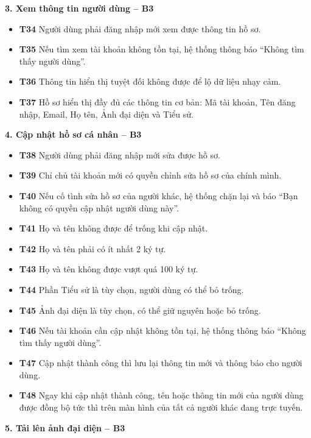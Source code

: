\documentclass[11pt,a4paper]{article}
\begin{document}
\smallskip
\noindent\textbf{3. Xem thông tin người dùng -- B3}
\begin{itemize}[leftmargin=0.9cm, label=$\bullet$, itemsep=2pt, topsep=4pt]
    \item \textbf{T34} Người dùng phải đăng nhập mới xem được thông tin hồ sơ.
    \item \textbf{T35} Nếu tìm xem tài khoản không tồn tại, hệ thống thông báo ``Không tìm thấy người dùng''.
    \item \textbf{T36} Thông tin hiển thị tuyệt đối không được để lộ dữ liệu nhạy cảm.
    \item \textbf{T37} Hồ sơ hiển thị đầy đủ các thông tin cơ bản: Mã tài khoản, Tên đăng nhập, Email, Họ tên, Ảnh đại diện và Tiểu sử.
\end{itemize}
\smallskip
\noindent\textbf{4. Cập nhật hồ sơ cá nhân -- B3}
\begin{itemize}[leftmargin=0.9cm, label=$\bullet$, itemsep=2pt, topsep=4pt]
    \item \textbf{T38} Người dùng phải đăng nhập mới sửa được hồ sơ.
    \item \textbf{T39} Chỉ chủ tài khoản mới có quyền chỉnh sửa hồ sơ của chính mình.
    \item \textbf{T40} Nếu cố tình sửa hồ sơ của người khác, hệ thống chặn lại và báo ``Bạn không có quyền cập nhật người dùng này''.
    \item \textbf{T41} Họ và tên không được để trống khi cập nhật.
    \item \textbf{T42} Họ và tên phải có ít nhất 2 ký tự.
    \item \textbf{T43} Họ và tên không được vượt quá 100 ký tự.
    \item \textbf{T44} Phần Tiểu sử là tùy chọn, người dùng có thể bỏ trống.
    \item \textbf{T45} Ảnh đại diện là tùy chọn, có thể giữ nguyên hoặc bỏ trống.
    \item \textbf{T46} Nếu tài khoản cần cập nhật không tồn tại, hệ thống thông báo ``Không tìm thấy người dùng''.
    \item \textbf{T47} Cập nhật thành công thì lưu lại thông tin mới và thông báo cho người dùng.
    \item \textbf{T48} Ngay khi cập nhật thành công, tên hoặc thông tin mới của người dùng được đồng bộ tức thì trên màn hình của tất cả người khác đang trực tuyến.
\end{itemize}
\smallskip
\noindent\textbf{5. Tải lên ảnh đại diện -- B3}
\end{document}

